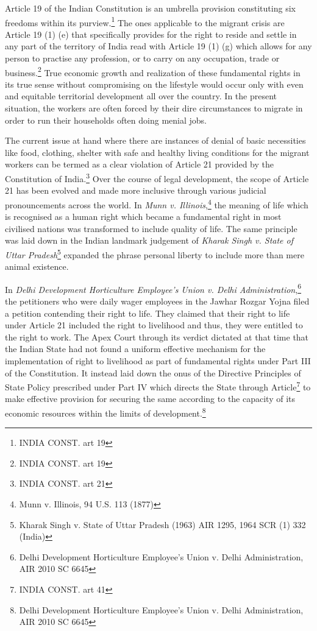 \begin{multicols}{2}
\noi
Article 19 of the Indian Constitution is an umbrella provision constituting six freedoms
within its purview.\footnote{INDIA CONST. art 19 } The ones applicable to the migrant crisis are Article 19 (1) (e) that
specifically provides for the right to reside and settle in any part of the territory of India read
with Article 19 (1) (g) which allows for any person to practise any profession, or to carry on
any occupation, trade or business.\footnote{INDIA CONST. art 19} True economic growth and realization of these
fundamental rights in its true sense without compromising on the lifestyle would occur only
with even and equitable territorial development all over the country. In the present situation,
the workers are often forced by their dire circumstances to migrate in order to run their
households often doing menial jobs.

\noi
The current issue at hand where there are instances of denial of basic necessities like food,
clothing, shelter with safe and healthy living conditions for the migrant workers can be
termed as a clear violation of Article 21 provided by the Constitution of India.\footnote{INDIA CONST. art 21} Over the
course of legal development, the scope of Article 21 has been evolved and made more
inclusive through various judicial pronouncements across the world. In \textit{Munn v. Illinois},\footnote{Munn v. Illinois, 94 U.S. 113 (1877)}
the meaning of life which is recognised as a human right which became a fundamental right
in most civilised nations was transformed to include quality of life. The same principle was
laid down in the Indian landmark judgement of \textit{Kharak Singh v. State of Uttar Pradesh}\footnote{Kharak Singh v. State of Uttar Pradesh (1963) AIR 1295, 1964 SCR (1) 332 (India)}
expanded the phrase personal liberty to include more than mere animal existence. 

\noi
In \textit{Delhi Development Horticulture Employee's Union v. Delhi Administration},\footnote{Delhi Development Horticulture Employee’s Union v. Delhi Administration, AIR 2010 SC 6645} the
petitioners who were daily wager employees in the Jawhar Rozgar Yojna filed a petition
contending their right to life. They claimed that their right to life under Article 21 included
the right to livelihood and thus, they were entitled to the right to work. The Apex Court
through its verdict dictated at that time that the Indian State had not found a uniform effective
mechanism for the implementation of right to livelihood as part of fundamental rights under
Part III of the Constitution. It instead laid down the onus of the Directive Principles of State
Policy prescribed under Part IV which directs the State through Article\footnote{INDIA CONST. art 41} to make effective
provision for securing the same according to the capacity of its economic resources within the
limits of development.\footnote{Delhi Development Horticulture Employee's Union v. Delhi Administration, AIR 2010 SC 6645}


\end{multicols}
